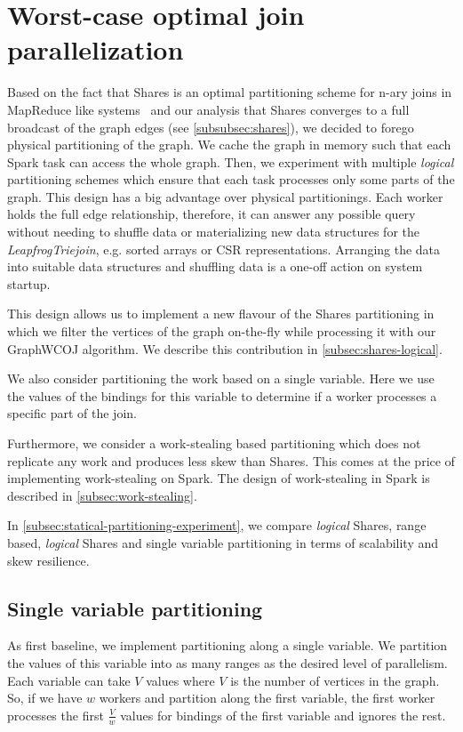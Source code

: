 \section{Worst-case optimal join parallelization}\label{sec:worst-case-optimal-join-parallelization}
Based on the fact that Shares is an optimal partitioning scheme for n-ary joins in MapReduce like systems~\cite{shares} and
our analysis that Shares converges to a full broadcast of the graph edges (see \cref{subsubsec:shares}), we decided
to forego physical partitioning of the graph.
We cache the graph in memory such that each Spark task can access the whole graph.
Then, we experiment with multiple \textit{logical} partitioning schemes which ensure that each task processes
only some parts of the graph.
This design has a big advantage over physical partitionings.
Each worker holds the full edge relationship, therefore, it can answer any possible query without needing to shuffle data or
materializing new data structures for the \textit{LeapfrogTriejoin}, e.g. sorted arrays or CSR representations.
Arranging the data into suitable data structures and shuffling data is a one-off action on system startup.

This design allows us to implement a new flavour of the Shares partitioning in which we filter the vertices of the
graph on-the-fly while processing it with our GraphWCOJ algorithm.
We describe this contribution in \cref{subsec:shares-logical}.

We also consider partitioning the work based on a single variable.
Here we use the values of the bindings for this variable to determine if a worker processes a specific part of the join.

Furthermore, we consider a work-stealing based partitioning which does not replicate any work and produces less
skew than Shares.
This comes at the price of implementing work-stealing on Spark.
The design of work-stealing in Spark is described in \cref{subsec:work-stealing}.

In \cref{subsec:statical-partitioning-experiment}, we compare \textit{logical} Shares, range based, \textit{logical} Shares
and single variable partitioning in terms of scalability and skew resilience.

\subsection{Single variable partitioning} \label{subsec:single-variable-partitioning}
As first baseline, we implement partitioning along a single variable.
We partition the values of this variable into as many ranges as the desired level of parallelism.
Each variable can take $V$ values where $V$ is the number of vertices in the graph.
So, if we have $w$ workers and partition along the first variable, the first worker processes the first $\frac{V}{w}$ values for
bindings of the first variable and ignores the rest.


